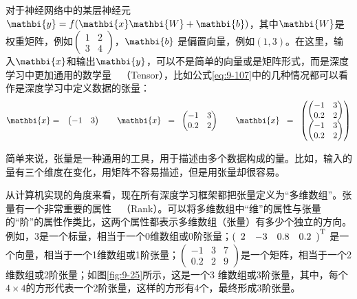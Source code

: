 \parinterval 对于神经网络中的某层神经元${\mathbi{y}}=f({\mathbi{x}}{\mathbi{W}}+{\mathbi{b}}) $，其中$ {\mathbi{W}} $是权重矩阵，例如$ \begin{pmatrix} 1 & 2\\ 3 & 4\end{pmatrix} $，${\mathbi{b}} $ 是偏置向量，例如$ (1,3) $。在这里，输入$ {\mathbi{x}} $和输出$ {\mathbi{y}} $，可以不是简单的向量或是矩阵形式，而是深度学习中更加通用的数学量\ \dash \ {\small{}}（Tensor），比如公式\eqref{eq:9-107}中的几种情况都可以看作是深度学习中定义数据的张量：
\begin{eqnarray}
{\mathbi{x}}&=&\begin{pmatrix} -1 & 3\end{pmatrix}\qquad
{\mathbi{x}}\;\;=\;\;\begin{pmatrix} -1 & 3\\ 0.2 & 2\end{pmatrix}\qquad
{\mathbi{x}}\;\;=\;\;\begin{pmatrix}{\begin{pmatrix} -1 & 3\\ 0.2 & 2\end{pmatrix}}\\{\begin{pmatrix} -1 & 3\\ 0.2 & 2\end{pmatrix}}\end{pmatrix}
\label{eq:9-107}
\end{eqnarray}

\parinterval 简单来说，张量是一种通用的工具，用于描述由多个数据构成的量。比如，输入的量有三个维度在变化，用矩阵不容易描述，但是用张量却很容易。

\parinterval 从计算机实现的角度来看，现在所有深度学习框架都把张量定义为“多维数组”。张量有一个非常重要的属性\ \dash \ {\small{}}（Rank）。可以将多维数组中“维”的属性与张量的“阶”的属性作类比，这两个属性都表示多维数组（张量）有多少个独立的方向。例如，3是一个标量，相当于一个0维数组或0阶张量；$ {(\begin{array}{cccc} 2 & -3 & 0.8 & 0.2\end{array})}^{\textrm T} $ 是一个向量，相当于一个1维数组或1阶张量；$ \begin{pmatrix} -1 & 3 & 7\\ 0.2 & 2 & 9\end{pmatrix} $是一个矩阵，相当于一个2维数组或2阶张量；如图\ref{fig:9-25}所示，这是一个3 维数组或3阶张量，其中，每个$4 \times 4$的方形代表一个2阶张量，这样的方形有4个，最终形成3阶张量。

